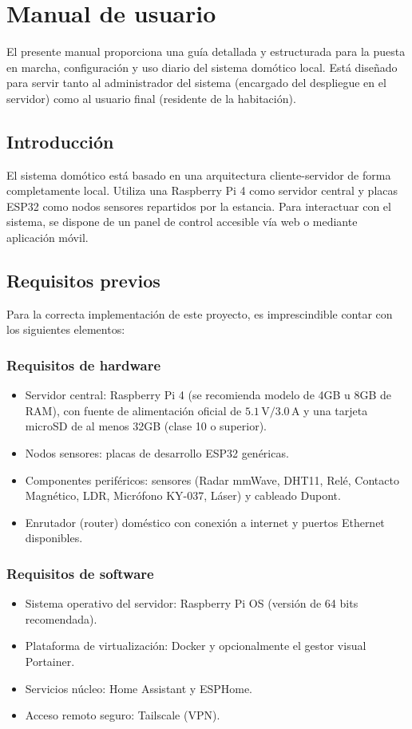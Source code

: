 \newpage
\section{Manual de usuario}
\label{anexo:manual_usuario}

El presente manual proporciona una guía detallada y estructurada para la puesta en marcha, configuración y uso diario del sistema domótico local. Está diseñado para servir tanto al administrador del sistema (encargado del despliegue en el servidor) como al usuario final (residente de la habitación).

\subsection{Introducción}
El sistema domótico está basado en una arquitectura cliente-servidor de forma completamente local. Utiliza una Raspberry Pi 4 como servidor central y placas ESP32 como nodos sensores repartidos por la estancia. Para interactuar con el sistema, se dispone de un panel de control accesible vía web o mediante aplicación móvil.

\subsection{Requisitos previos}
Para la correcta implementación de este proyecto, es imprescindible contar con los siguientes elementos:

\subsubsection{Requisitos de hardware}
\begin{itemize}
    \item Servidor central: Raspberry Pi 4 (se recomienda modelo de 4GB u 8GB de RAM), con fuente de alimentación oficial de $5.1\,\text{V}/3.0\,\text{A}$ y una tarjeta microSD de al menos 32GB (clase 10 o superior).
    \item Nodos sensores: placas de desarrollo ESP32 genéricas.
    \item Componentes periféricos: sensores (Radar mmWave, DHT11, Relé, Contacto Magnético, LDR, Micrófono KY-037, Láser) y cableado Dupont.
    \item Enrutador (router) doméstico con conexión a internet y puertos Ethernet disponibles.
\end{itemize}

\subsubsection{Requisitos de software}
\begin{itemize}
    \item Sistema operativo del servidor: Raspberry Pi OS (versión de 64 bits recomendada).
    \item Plataforma de virtualización: Docker y opcionalmente el gestor visual Portainer.
    \item Servicios núcleo: Home Assistant y ESPHome.
    \item Acceso remoto seguro: Tailscale (VPN).
\end{itemize}

